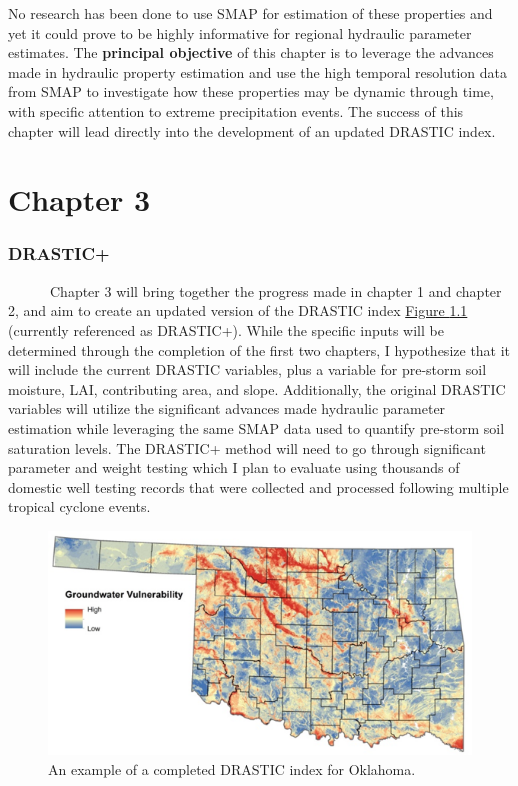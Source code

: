 \documentclass[
]{book}
\begin{document}
No research has been done to use SMAP for estimation of these properties and yet it could prove to be highly informative for regional hydraulic parameter estimates. The \textbf{principal objective} of this chapter is to leverage the advances made in hydraulic property estimation and use the high temporal resolution data from SMAP to investigate how these properties may be dynamic through time, with specific attention to extreme precipitation events. The success of this chapter will lead directly into the development of an updated DRASTIC index.

\hypertarget{chapter3}{%
\chapter{Chapter 3}\label{chapter3}}

\hypertarget{drastic}{%
\subsection{DRASTIC+}\label{drastic}}

~~~~~~Chapter 3 will bring together the progress made in chapter 1 and chapter 2, and aim to create an updated version of the DRASTIC index \protect\hyperlink{fig:DRASTIC}{Figure \ref{fig:DRASTIC}} (currently referenced as DRASTIC+). While the specific inputs will be determined through the completion of the first two chapters, I hypothesize that it will include the current DRASTIC variables, plus a variable for pre-storm soil moisture, LAI, contributing area, and slope. Additionally, the original DRASTIC variables will utilize the significant advances made hydraulic parameter estimation while leveraging the same SMAP data used to quantify pre-storm soil saturation levels. The DRASTIC+ method will need to go through significant parameter and weight testing which I plan to evaluate using thousands of domestic well testing records that were collected and processed following multiple tropical cyclone events.

\begin{figure}
\includegraphics[width=1\linewidth]{img/DRASTIC} \caption{An example of a completed DRASTIC index for Oklahoma.}\label{fig:DRASTIC}
\end{figure}
\end{document}
